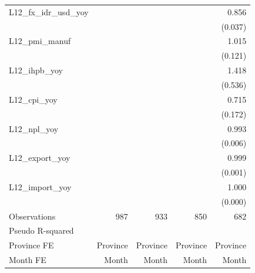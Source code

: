 {\begin{tabular}{l*{4}{D{.}{.}{-1}}}
\addlinespace
L12\_fx\_idr\_usd\_yoy&                  &                  &                  &    0.856\sym{***}\\
                &                  &                  &                  &  (0.037)         \\
\addlinespace
L12\_pmi\_manuf   &                  &                  &                  &    1.015         \\
                &                  &                  &                  &  (0.121)         \\
\addlinespace
L12\_ihpb\_yoy    &                  &                  &                  &    1.418         \\
                &                  &                  &                  &  (0.536)         \\
\addlinespace
L12\_cpi\_yoy     &                  &                  &                  &    0.715         \\
                &                  &                  &                  &  (0.172)         \\
\addlinespace
L12\_npl\_yoy     &                  &                  &                  &    0.993         \\
                &                  &                  &                  &  (0.006)         \\
\addlinespace
L12\_export\_yoy  &                  &                  &                  &    0.999         \\
                &                  &                  &                  &  (0.001)         \\
\addlinespace
L12\_import\_yoy  &                  &                  &                  &    1.000         \\
                &                  &                  &                  &  (0.000)         \\
\midrule
Observations    &      987         &      933         &      850         &      682         \\
Pseudo R-squared&                  &                  &                  &                  \\
Province FE     & Province         & Province         & Province         & Province         \\
Month FE        &    Month         &    Month         &    Month         &    Month         \\
\bottomrule
\end{tabular}
}
